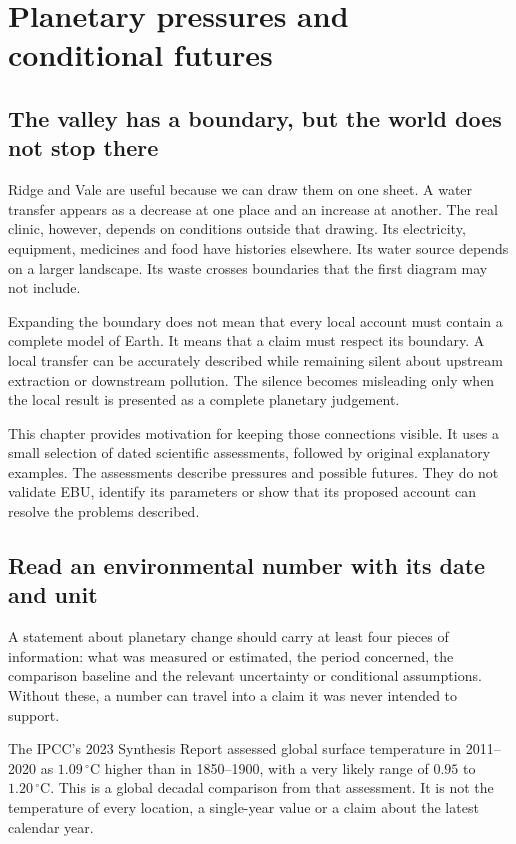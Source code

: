 \chapter{Planetary pressures and conditional futures}\label{ch:planet}

\section{The valley has a boundary, but the world does not stop there}
Ridge and Vale are useful because we can draw them on one sheet. A water transfer appears as a decrease at one place and an increase at another. The real clinic, however, depends on conditions outside that drawing. Its electricity, equipment, medicines and food have histories elsewhere. Its water source depends on a larger landscape. Its waste crosses boundaries that the first diagram may not include.

Expanding the boundary does not mean that every local account must contain a complete model of Earth. It means that a claim must respect its boundary. A local transfer can be accurately described while remaining silent about upstream extraction or downstream pollution. The silence becomes misleading only when the local result is presented as a complete planetary judgement.

This chapter provides motivation for keeping those connections visible. It uses a small selection of dated scientific assessments, followed by original explanatory examples. The assessments describe pressures and possible futures. They do not validate EBU, identify its parameters or show that its proposed account can resolve the problems described.

\section{Read an environmental number with its date and unit}
A statement about planetary change should carry at least four pieces of information: what was measured or estimated, the period concerned, the comparison baseline and the relevant uncertainty or conditional assumptions. Without these, a number can travel into a claim it was never intended to support.

The IPCC's 2023 Synthesis Report assessed global surface temperature in 2011--2020 as $1.09\,^{\circ}\mathrm{C}$ higher than in 1850--1900, with a very likely range of $0.95$ to $1.20\,^{\circ}\mathrm{C}$. This is a global decadal comparison from that assessment. It is not the temperature of every location, a single-year value or a claim about the latest calendar year.\cite{intro-ipcc}

